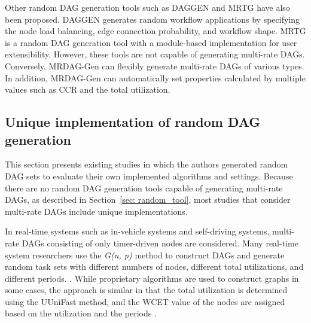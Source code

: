 Other random DAG generation tools such as DAGGEN \cite{amalarethinam2011dagen} and MRTG \cite{ashish2016modular} have also been proposed.
DAGGEN generates random workflow applications by specifying the node load balancing, edge connection probability, and workflow shape.
MRTG is a random DAG generation tool with a module-based implementation for user extensibility.
However, these tools are not capable of generating multi-rate DAGs.
Conversely, MRDAG-Gen can flexibly generate multi-rate DAGs of various types.
In addition, MRDAG-Gen can automatically set properties calculated by multiple values such as CCR and the total utilization.


\subsection{Unique implementation of random DAG generation}

This section presents existing studies in which the authors generated random DAG sets to evaluate their own implemented algorithms and settings.
Because there are no random DAG generation tools capable of generating multi-rate DAGs, as described in Section~\ref{sec: random_tool}, most studies that consider multi-rate DAGs include unique implementations.

In real-time systems such as in-vehicle systems and self-driving systems, multi-rate DAGs consisting of only timer-driven nodes are considered.
Many real-time system researchers use the {\it G(n, p)} method to construct DAGs and generate random task sets with different numbers of nodes, different total utilizations, and different periods. \cite{voronov2021ai, he2021response, dong2019efficient}.
While proprietary algorithms are used to construct graphs in some cases, the approach  is similar in that the total utilization is determined using the UUniFast method, and the WCET value of the nodes are assigned based on the utilization and the periods \cite{yang2020mixed, gunzel2021suspension, ueter2021hard}.

